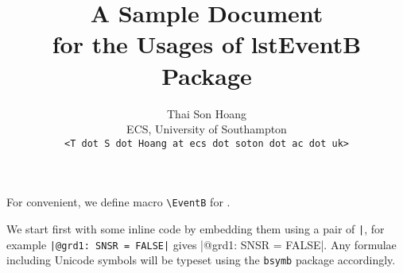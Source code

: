 \usepackage{verbatim}
\usepackage{mdframed}

\title{A Sample Document\\for the Usages of \textsf{lstEventB} Package}
\author{Thai Son Hoang\\ECS, University of Southampton\\\texttt{<T dot S dot Hoang at ecs dot soton dot ac dot uk>}}


\maketitle
For convenient, we define macro \verb|\EventB| for \EventB. 

We start first with some inline \EventB code by embedding them using a pair of \verb$|$, for example \verb$|@grd1: SNSR = FALSE|$ gives |@grd1: SNSR = FALSE|. Any \EventB formulae including Unicode symbols will be typeset using the \verb|bsymb| package accordingly.

